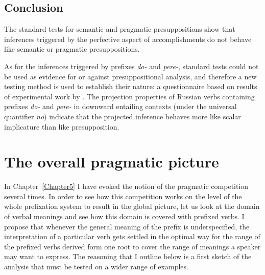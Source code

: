 \subsection{Conclusion}
The standard tests for semantic and pragmatic presuppositions show that inferences triggered by the perfective aspect of accomplishments do not behave like semantic or pragmatic presuppositions.

As for the inferences triggered by prefixes \textit{do-} and \textit{pere-}, standard tests could not be used as evidence for or against presuppositional analysis, and therefore a new testing method is used to establish their nature: a questionnaire based on results of experimental work by \citet{Chemla:09}.
The projection properties of Russian verbs containing prefixes \textit{do-} and \textit{pere-} in downward entailing contexts (under the universal quantifier \textit{no}) indicate that the projected inference behaves more like scalar implicature than like presupposition.


\section{The overall pragmatic picture}\label{section:pragm:overall}
In Chapter~\ref{Chapter5} I have evoked the notion of the pragmatic competition several times. In order to see how this competition works on the level of the whole prefixation system to result in the global picture, let us look at the domain of verbal meanings and see how this domain is covered with prefixed verbs. I propose that whenever the general meaning of the prefix is underspecified, the interpretation of a particular verb gets settled in the optimal way for the range of the prefixed verbs derived form one root to cover the range of meanings a speaker may want to express. The reasoning that I outline below is a first sketch of the analysis that must be tested on a wider range of examples.

